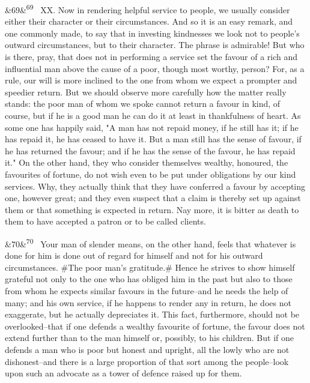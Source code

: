 \documentclass[12pt]{article}
\newcommand{\para}[1][]{\par\noindent\ifx&#1&\else\textsuperscript{\footnotesize #1}~\fi}
\begin{document}
\para[69] XX. Now in rendering helpful service to people, we usually consider either their character or their circumstances. And so it is an easy remark, and one commonly made, to say that in investing kindnesses we look not to people's outward circumstances, but to their character. The phrase is admirable! But who is there, pray, that does not in performing a service set the favour of a rich and influential man above the cause of a poor, though most worthy, person? For, as a rule, our will is more inclined to the one from whom we expect a prompter and speedier return. But we should observe more carefully how the matter really stands: the poor man of whom we spoke cannot return a favour in kind, of course, but if he is a good man he can do it at least in thankfulness of heart. As some one has happily said, "A man has not repaid money, if he still has it; if he has repaid it, he has ceased to have it. But a man still has the sense of favour, if he has returned the favour; and if he has the sense of the favour, he has repaid it." On the other hand, they who consider themselves wealthy, honoured, the favourites of fortune, do not wish even to be put under obligations by our kind services. Why, they actually think that they have conferred a favour by accepting one, however great; and they even suspect that a claim is thereby set up against them or that something is expected in return. Nay more, it is bitter as death to them to have accepted a patron or to be called clients.

\para[70] Your man of slender means, on the other hand, feels that whatever is done for him is done out of regard for himself and not for his outward circumstances. \#The poor man's gratitude.\# Hence he strives to show himself grateful not only to the one who has obliged him in the past but also to those from whom he expects similar favours in the future--and he needs the help of many; and his own service, if he happens to render any in return, he does not exaggerate, but he actually depreciates it. This fact, furthermore, should not be overlooked--that if one defends a wealthy favourite of fortune, the favour does not extend further than to the man himself or, possibly, to his children. But if one defends a man who is poor but honest and upright, all the lowly who are not dishonest--and there is a large proportion of that sort among the people--look upon such an advocate as a tower of defence raised up for them.
\end{document}
